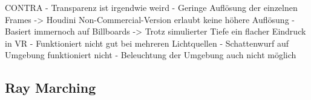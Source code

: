 CONTRA\newline
- Transparenz ist irgendwie weird\newline
- Geringe Auflösung der einzelnen Frames \newline
 -> Houdini Non-Commercial-Version erlaubt keine höhere Auflösung\newline
- Basiert immernoch auf Billboards\newline
 -> Trotz simulierter Tiefe ein flacher Eindruck in VR\newline
- Funktioniert nicht gut bei mehreren Lichtquellen\newline
- Schattenwurf auf Umgebung funktioniert nicht\newline
- Beleuchtung der  Umgebung auch nicht möglich\newline




\subsection{Ray Marching}
\label{sec:5.2}
